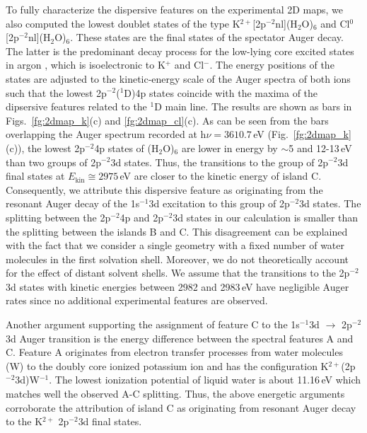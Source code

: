 To fully characterize the dispersive features on the experimental 2D maps, we also computed the lowest doublet states of the type K$^{2+}$[2p$^{-2}$nl](H$_2$O)$_6$ and Cl$^{0}$[2p$^{-2}$nl](H$_2$O)$_6$. These states are the final states of the spectator Auger decay. The latter is the predominant decay process for the low-lying core excited states in argon \citep{ceolin15:022502}, which is isoelectronic to K$^+$ and Cl$^-$. The energy positions of the states are adjusted to the kinetic-energy scale of the Auger spectra of both ions such that the lowest 2p$^{-2}$($^1$D)4p states coincide with the maxima of the dipsersive features related to the $^1$D main line. The results are shown as bars in Figs.\ \ref{fg:2dmap_k}(c) and \ref{fg:2dmap_cl}(c). As can be seen from the bars overlapping the Auger spectrum recorded at h$\nu = 3610.7$\,eV (Fig.\ \ref{fg:2dmap_k}(c)), the lowest 2p$^{-2}$4p states of \ki(H$_2$O)$_6$ are lower in energy by $\sim$5 and 12-13\,eV than two groups of 2p$^{-2}$3d states. Thus, the transitions to the group of 2p$^{-2}$3d final states at $E_{\text{kin}}\cong 2975$\,eV are closer to the kinetic energy of island C. Consequently, we attribute this dispersive feature as originating from the resonant Auger decay of the 1s$^{-1}$3d excitation to this group of 2p$^{-2}$3d states. The splitting between the 2p$^{-2}$4p and 2p$^{-2}$3d states in our calculation is smaller than the splitting between the islands B and C. This disagreement can be explained with the fact that we consider a single geometry with a fixed number of water molecules in the first solvation shell. Moreover, we do not theoretically account for the effect of distant solvent shells. We assume that the transitions to the 2p$^{-2}$3d states with kinetic energies between 2982 and 2983\,eV have negligible Auger rates since no additional experimental features are observed.


Another argument supporting the assignment of feature C to the 1s$^{-1}$3d $\rightarrow$ 2p$^{-2}$3d Auger transition is the energy difference between the spectral features A and C. Feature A originates from electron transfer processes from water molecules (W) to the doubly core ionized potassium ion and has the configuration K$^{2+}$(2p$^{-2}$3d)W$^{-1}$. The lowest ionization potential of liquid water is about 11.16\,eV \cite{winter04:2625} which matches well the observed A-C splitting. Thus, the above energetic arguments corroborate the attribution of island C as originating from resonant Auger decay to the K$^{2+}$ 2p$^{-2}$3d final states.


